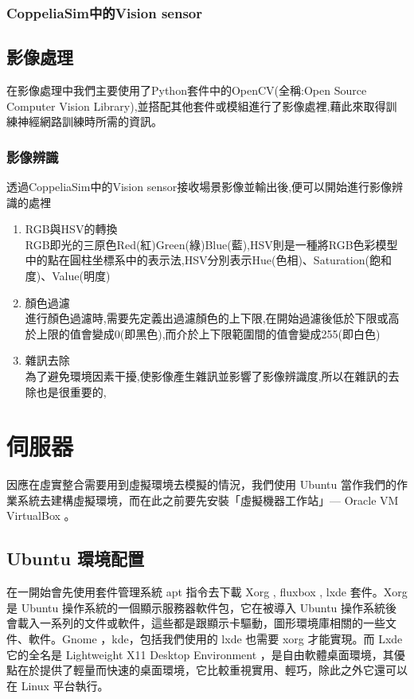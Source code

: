 \documentclass[14pt,a4paper]{report}  %
\begin{document}
\subsection{CoppeliaSim中的Vision sensor}

\section{影像處理}
\qquad 在影像處理中我們主要使用了Python套件中的OpenCV(全稱:Open Source Computer Vision Library),並搭配其他套件或模組進行了影像處裡,藉此來取得訓練神經網路訓練時所需的資訊。\\
\subsection{影像辨識}
\qquad 透過CoppeliaSim中的Vision sensor接收場景影像並輸出後,便可以開始進行影像辨識的處裡\\
\begin{enumerate}
\item RGB與HSV的轉換\\
RGB即光的三原色Red(紅)Green(綠)Blue(藍),HSV則是一種將RGB色彩模型中的點在圓柱坐標系中的表示法,HSV分別表示Hue(色相)、Saturation(飽和度)、Value(明度)\\
\item 顏色過濾\\
進行顏色過濾時,需要先定義出過濾顏色的上下限,在開始過濾後低於下限或高於上限的值會變成0(即黑色),而介於上下限範圍間的值會變成255(即白色)\\
\item 雜訊去除\\
為了避免環境因素干擾,使影像產生雜訊並影響了影像辨識度,所以在雜訊的去除也是很重要的,
\end{enumerate}
\newpage
\chapter{伺服器}
 因應在虛實整合需要用到虛擬環境去模擬的情況，我們使用 Ubuntu 當作我們的作業系統去建構虛擬環境，而在此之前要先安裝「虛擬機器工作站」— Oracle VM VirtualBox 。\\
\section{Ubuntu 環境配置}
 在一開始會先使用套件管理系統 apt 指令去下載 Xorg , fluxbox , lxde 套件。Xorg 是 Ubuntu 操作系統的一個顯示服務器軟件包，它在被導入 Ubuntu 操作系統後會載入一系列的文件或軟件，這些都是跟顯示卡驅動，圖形環境庫相關的一些文件、軟件。Gnome ，kde，包括我們使用的 lxde 也需要 xorg 才能實現。而 Lxde 它的全名是 Lightweight X11 Desktop Environment ，是自由軟體桌面環境，其優點在於提供了輕量而快速的桌面環境，它比較重視實用、輕巧，除此之外它還可以在 Linux 平台執行。\\
 
\end{document}
